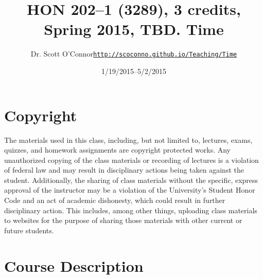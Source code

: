 \documentclass[article,oneside]{memoir}
\def\myauthor{Author}
\def\mytitle{Title}
\def\mycopyright{\myauthor}
\def\myweb{\href{http://scoconno.github.io/Teaching/Time}{http://scoconno.github.io/Teaching/Time}}
\def\myauthor{Dr. Scott O'Connor}
\def\mytitle{{\normalsize HON 202--1 (3289), 3 credits, Spring 2015, TBD. \newline} \HUGE Time}
\begin{document}
\setsansfont[Mapping=tex-text]{Myriad Pro} 
\setmonofont[Mapping=tex-text,Scale=0.8]{Georgia} 

\def\ind{\hangindent=1 true cm\hangafter=1 \noindent}
\def\labelitemi{$\cdot$}


\title{\LARGE \mytitle}     
\author{\Large\myauthor \newline \footnotesize\texttt{\noindent\myweb}}
\date{1/19/2015--5/2/2015}

\published{\today}

\maketitle




%
%

\section{Copyright}
The materials used in this class, including, but not limited to, lectures, exams, quizzes, and homework assignments are copyright protected works.  Any unauthorized copying of the class materials or recording of lectures is a violation of federal law and may result in disciplinary actions being taken against the student.  Additionally, the sharing of class materials without the specific, express approval of the instructor may be a violation of the University's Student Honor Code and an act of academic dishonesty, which could result in further disciplinary action.  This includes, among other things, uploading class materials to websites for the purpose of sharing those materials with other current or future students. 



\section{Course Description}
\end{document}
